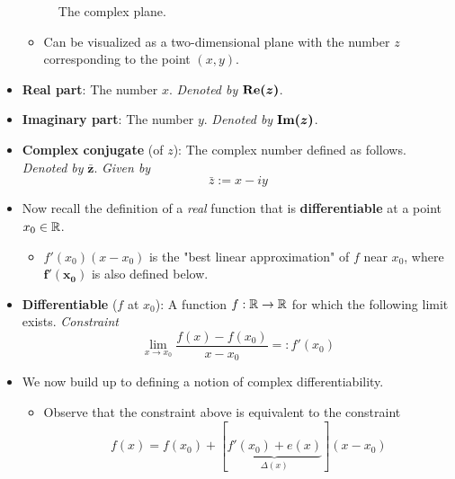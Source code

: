 \documentclass[../notes.tex]{subfiles}
\begin{document}
\begin{itemize}
\begin{figure}[h!]
        \caption{The complex plane.}
        \label{fig:complexPlane}
    \end{figure}
    \vspace{-0.4em}
    \begin{itemize}
        \item Can be visualized as a two-dimensional plane with the number $z$ corresponding to the point $(x,y)$.
    \end{itemize}
    \item \textbf{Real part}: The number $x$. \emph{Denoted by} $\bm{\re(z)}$.
    \item \textbf{Imaginary part}: The number $y$. \emph{Denoted by} $\bm{\im(z)}$.
    \item \textbf{Complex conjugate} (of $z$): The complex number defined as follows. \emph{Denoted by} $\bm{\bar{z}}$. \emph{Given by}
    \begin{equation*}
        \bar{z} := x-iy
    \end{equation*}
    \item Now recall the definition of a \emph{real} function that is \textbf{differentiable} at a point $x_0\in\mathbb{R}$.
    \begin{itemize}
        \item $f'(x_0)(x-x_0)$ is the "best linear approximation" of $f$ near $x_0$, where $\bm{f'(x_0)}$ is also defined below.
    \end{itemize}
    \item \textbf{Differentiable} ($f$ at $x_0$): A function $f:\mathbb{R}\to\mathbb{R}$ for which the following limit exists. \emph{Constraint}
    \begin{equation*}
        \lim_{x\to x_0}\frac{f(x)-f(x_0)}{x-x_0} =: f'(x_0)
    \end{equation*}
    \item We now build up to defining a notion of complex differentiability.
    \begin{itemize}
        \item Observe that the constraint above is equivalent to the constraint
        \begin{equation*}
            f(x) = f(x_0)+[\underbrace{f'(x_0)+e(x)}_{\Delta(x)}](x-x_0)

\end{equation*}
\end{itemize}
\end{itemize}
\end{document}
